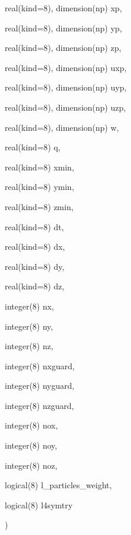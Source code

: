 {\begin{DoxyParamCaption}
\item[{real(kind=8), dimension(np)}]{xp, }
\item[{real(kind=8), dimension(np)}]{yp, }
\item[{real(kind=8), dimension(np)}]{zp, }
\item[{real(kind=8), dimension(np)}]{uxp, }
\item[{real(kind=8), dimension(np)}]{uyp, }
\item[{real(kind=8), dimension(np)}]{uzp, }
\item[{real(kind=8), dimension(np)}]{w, }
\item[{real(kind=8)}]{q, }
\item[{real(kind=8)}]{xmin, }
\item[{real(kind=8)}]{ymin, }
\item[{real(kind=8)}]{zmin, }
\item[{real(kind=8)}]{dt, }
\item[{real(kind=8)}]{dx, }
\item[{real(kind=8)}]{dy, }
\item[{real(kind=8)}]{dz, }
\item[{integer(8)}]{nx, }
\item[{integer(8)}]{ny, }
\item[{integer(8)}]{nz, }
\item[{integer(8)}]{nxguard, }
\item[{integer(8)}]{nyguard, }
\item[{integer(8)}]{nzguard, }
\item[{integer(8)}]{nox, }
\item[{integer(8)}]{noy, }
\item[{integer(8)}]{noz, }
\item[{logical(8)}]{l\+\_\+particles\+\_\+weight, }
\item[{logical(8)}]{l4symtry}
\end{DoxyParamCaption}
)}\hypertarget{current__deposition_8_f90_af8faa4a1c6a61774bcfddd4519751c41}{}\label{current__deposition_8_f90_af8faa4a1c6a61774bcfddd4519751c41}

